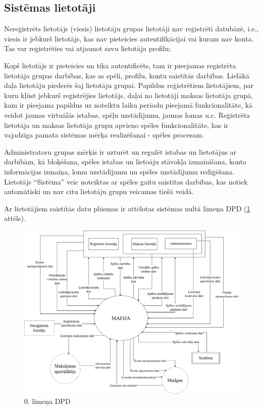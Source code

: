 \subsection{Sistēmas lietotāji}


Nereģistrēts lietotājs (viesis) lietotāju grupas lietotāji nav reģistrēti datubāzē, i.e., viesis ir jebkurš lietotājs, kas nav pieteicies autentifikācijai vai kuram nav konta.
Tas var reģistrēties vai atjaunot savu lietotāja profilu;

Kopš lietotājs ir pieteicies un tika autentificēts, tam ir pieejamas registrēta lietotāja grupas darbības, kas as spēli, profilu, kontu saistītās darbības.
Lielākā daļa lietotāju piederēs šaj lietotāju grupai.
Papildus reģistrētiem lietotājiem, par kuru kļūst jebkurš reģistrējies lietotājs, daļai no lietotāji maksas lietotāja grupā, kam ir pieejama papildus uz noteiktu laiku periodu pieejamā funkcionalitāte, kā veidot jaunas virtuālās istabas, spēļu uzstādījumu, jaunas lomas u.c.
Reģistrēta lietotāja un maksas lietotāja grupu apvieno spēles funkcionalitāte, kas ir vajadzīga pamata sistēmas mērķa realizēšanai - spēles procesam.

Administratoru grupas mērķis ir uzturēt un regulēt istabas un lietotājus ar darbībām, kā bloķēšana, spēles istabas un lietoāju stāvokļa izmainīšana, konta informācijas izmaiņa, lomu uzstādījumu un spēles uzstādījumu rediģēšana.
Lietotājs ``Sistēma'' veic noteiktas ar spēles gaitu saistītas darbības, kas notiek automātiski un nav citu lietotāju grupu veicamas tiešā veidā.

Ar lietotājiem saistītās datu plūsmas ir attēlotas sistēmas nultā līmeņa DPD (\ref{fig:dpd-0} attēls).


\begin{figure}[htbp]
	\centering
	\includegraphics[width=\linewidth]{./src/img/0tāLīmeņaDPD.png}
	\caption{0. līmeņa DPD}
	\label{fig:dpd-0}
\end{figure}
